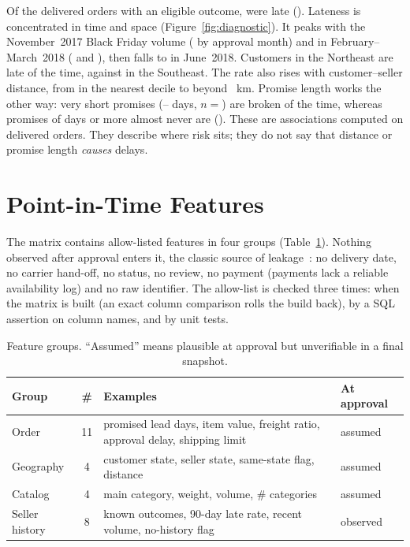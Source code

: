 \documentclass[10pt,twocolumn]{article}
\begin{document}
Of the \NLabelled{} delivered orders with an eligible outcome, \NLate{} were late
(\LateRate{}). Lateness is concentrated in time and space (Figure~\ref{fig:diagnostic}). It peaks with
the November~2017 Black Friday volume (\LateNov{} by approval month) and in February--March~2018
(\LateFeb{} and \LateMar{}), then falls to \LateJun{} in June~2018. Customers in the Northeast are late
\RateNortheast{} of the time, against \RateSoutheast{} in the Southeast. The rate also rises with
customer--seller distance, from \DistFirst{} in the nearest decile to \DistLast{} beyond
\DistLastLo{}~km. Promise length works the other way: very short promises
(\PromiseShortLo--\PromiseShortHi{} days, $n=$\PromiseShortN{}) are broken \PromiseShortRate{} of the
time, whereas promises of \PromiseLongLo{} days or more almost never are (\PromiseLongRate{}).
These are associations computed on delivered orders. They describe where risk sits; they do not say
that distance or promise length \emph{causes} delays.


\section{Point-in-Time Features}\label{sec:features}





The matrix contains \NFeatures{} allow-listed features in four groups (Table~\ref{tab:features}).
Nothing observed after approval enters it, the classic source of leakage~\cite{kaufman2012}: no delivery date, no carrier hand-off, no status, no review,
no payment (payments lack a reliable availability log) and no raw identifier. The allow-list is checked
three times: when the matrix is built (an exact column comparison rolls the build back), by a SQL
assertion on column names, and by unit tests.

\begin{table}[t]
\centering\small
\caption{Feature groups. ``Assumed'' means plausible at approval but unverifiable in a final snapshot.}
\label{tab:features}
\footnotesize
\begin{tabularx}{\columnwidth}{@{}l c >{\raggedright\arraybackslash}X l@{}}
\toprule
Group & \# & Examples & At approval \\
\midrule
Order & 11 & promised lead days, item value, freight ratio, approval delay, shipping limit & assumed \\
Geography & 4 & customer state, seller state, same-state flag, distance & assumed \\
Catalog & 4 & main category, weight, volume, \# categories & assumed \\
Seller history & 8 & known outcomes, 90-day late rate, recent volume, no-history flag & observed \\
\bottomrule
\end{tabularx}
\end{table}
\end{document}
